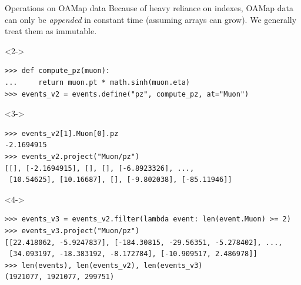 \documentclass[aspectratio=169]{beamer}
\begin{document}
\begin{frame}[fragile]{Operations on OAMap data}
\vspace{0.3 cm}
Because of heavy reliance on indexes, OAMap data can only be {\it appended} in constant time (assuming arrays can grow). We generally treat them as immutable.

\small
\begin{uncoverenv}<2->
\begin{verbatim}
>>> def compute_pz(muon):
...     return muon.pt * math.sinh(muon.eta)
>>> events_v2 = events.define("pz", compute_pz, at="Muon")
\end{verbatim}
\end{uncoverenv}
\begin{uncoverenv}<3->
\begin{verbatim}
>>> events_v2[1].Muon[0].pz
-2.1694915
>>> events_v2.project("Muon/pz")
[[], [-2.1694915], [], [], [-6.8923326], ...,
 [10.54625], [10.16687], [], [-9.802038], [-85.11946]]
\end{verbatim}
\end{uncoverenv}
\begin{uncoverenv}<4->
\begin{verbatim}
>>> events_v3 = events_v2.filter(lambda event: len(event.Muon) >= 2)
>>> events_v3.project("Muon/pz")
[[22.418062, -5.9247837], [-184.30815, -29.56351, -5.278402], ...,
 [34.093197, -18.383192, -8.172784], [-10.909517, 2.486978]]
>>> len(events), len(events_v2), len(events_v3)
(1921077, 1921077, 299751)
\end{verbatim}
\end{uncoverenv}
\end{frame}
\end{document}
